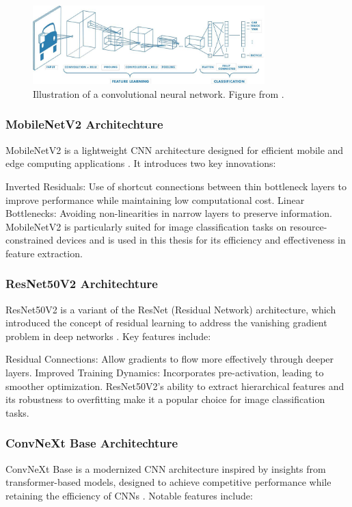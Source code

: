 \begin{figure}[ht]
    \centering
    \includegraphics[width=0.8\textwidth]{Images/CNN_illustration.jpg} 
    \caption{Illustration of a convolutional neural network. Figure from \cite{mathworks_cnn}.}
    \label{fig:cnn_illustration}
\end{figure}

\subsubsection{MobileNetV2 Architechture}

MobileNetV2 is a lightweight CNN architecture designed for efficient mobile and edge computing applications \cite{sandler2018mobilenetv2}. It introduces two key innovations:

Inverted Residuals: Use of shortcut connections between thin bottleneck layers to improve performance while maintaining low computational cost.
Linear Bottlenecks: Avoiding non-linearities in narrow layers to preserve information. MobileNetV2 is particularly suited for image classification tasks on resource-constrained devices and is used in this thesis for its efficiency and effectiveness in feature extraction.

\subsubsection{ResNet50V2 Architechture}
ResNet50V2 is a variant of the ResNet (Residual Network) architecture, which introduced the concept of residual learning to address the vanishing gradient problem in deep networks \cite{he2016}. Key features include:

Residual Connections: Allow gradients to flow more effectively through deeper layers.
Improved Training Dynamics: Incorporates pre-activation, leading to smoother optimization. ResNet50V2’s ability to extract hierarchical features and its robustness to overfitting make it a popular choice for image classification tasks.

\subsubsection{ConvNeXt Base Architechture}
ConvNeXt Base is a modernized CNN architecture inspired by insights from transformer-based models, designed to achieve competitive performance while retaining the efficiency of CNNs \cite{todi2023convnext}. Notable features include:

